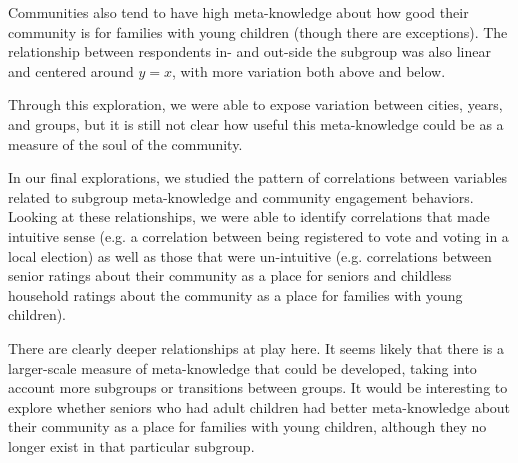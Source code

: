 \documentclass[smallextended]{svjour3}\usepackage[]{graphicx}\usepackage[]{color}
\begin{document}
Communities also tend to have high meta-knowledge about how good their community is for families with young children (though there are exceptions). The relationship between respondents in- and out-side the subgroup was also linear and centered around $y=x$, with more variation both above and below. 

Through this exploration, we were able to expose variation between cities, years, and groups, but it is still not clear how useful this meta-knowledge could be as a measure of the soul of the community. 

In our final explorations, we studied the pattern of correlations between variables related to subgroup meta-knowledge and community engagement behaviors. Looking at these relationships, we were able to identify correlations that made intuitive sense (e.g. a correlation between being registered to vote and voting in a local election) as well as those that were un-intuitive (e.g. correlations between senior ratings about their community as a place for seniors and childless household ratings about the community as a place for families with young children). 

There are clearly deeper relationships at play here. It seems likely that there is a larger-scale measure of meta-knowledge that could be developed, taking into account more subgroups or transitions between groups. It would be interesting to explore whether seniors who had adult children had better meta-knowledge about their community as a place for families with young children, although they no longer exist in that particular subgroup. 


\end{document}
